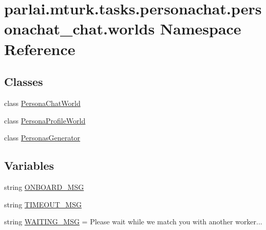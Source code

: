 \hypertarget{namespaceparlai_1_1mturk_1_1tasks_1_1personachat_1_1personachat__chat_1_1worlds}{}\section{parlai.\+mturk.\+tasks.\+personachat.\+personachat\+\_\+chat.\+worlds Namespace Reference}
\label{namespaceparlai_1_1mturk_1_1tasks_1_1personachat_1_1personachat__chat_1_1worlds}
\subsection*{Classes}
\begin{DoxyCompactItemize}
\item 
class \hyperlink{classparlai_1_1mturk_1_1tasks_1_1personachat_1_1personachat__chat_1_1worlds_1_1PersonaChatWorld}{Persona\+Chat\+World}
\item 
class \hyperlink{classparlai_1_1mturk_1_1tasks_1_1personachat_1_1personachat__chat_1_1worlds_1_1PersonaProfileWorld}{Persona\+Profile\+World}
\item 
class \hyperlink{classparlai_1_1mturk_1_1tasks_1_1personachat_1_1personachat__chat_1_1worlds_1_1PersonasGenerator}{Personas\+Generator}
\end{DoxyCompactItemize}
\subsection*{Variables}
\begin{DoxyCompactItemize}
\item 
string \hyperlink{namespaceparlai_1_1mturk_1_1tasks_1_1personachat_1_1personachat__chat_1_1worlds_ae8b53a1b11f7d488a44c248b3bbd0626}{O\+N\+B\+O\+A\+R\+D\+\_\+\+M\+SG}
\item 
string \hyperlink{namespaceparlai_1_1mturk_1_1tasks_1_1personachat_1_1personachat__chat_1_1worlds_afdbcea93fd6c922f621ba6fcb5fa3873}{T\+I\+M\+E\+O\+U\+T\+\_\+\+M\+SG}
\item 
string \hyperlink{namespaceparlai_1_1mturk_1_1tasks_1_1personachat_1_1personachat__chat_1_1worlds_a4ab0afffbdc84e52c9099fddbee3bf54}{W\+A\+I\+T\+I\+N\+G\+\_\+\+M\+SG} = \textquotesingle{}Please wait while we match you with another worker...\textquotesingle{}
\end{DoxyCompactItemize}


